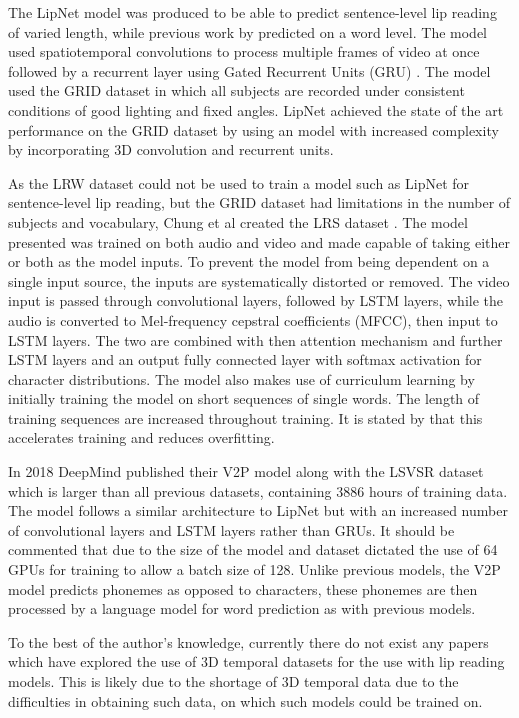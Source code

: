 \documentclass[12pt]{report}
\begin{document}
The LipNet model \cite{Assael2016} was produced to be able to predict sentence-level lip reading of varied length, while previous work by \cite{Chung2016} predicted on a word level.
The model used spatiotemporal convolutions to process multiple frames of video at once followed by a recurrent layer using Gated Recurrent Units (GRU) \cite{Cho2014}.
The model used the GRID dataset \cite{Cooke2006} in which all subjects are recorded under consistent conditions of good lighting and fixed angles.
LipNet achieved the state of the art performance on the GRID dataset by using an model with increased complexity by incorporating 3D convolution and recurrent units.

As the LRW dataset could not be used to train a model such as LipNet for sentence-level lip reading, but the GRID dataset had limitations in the number of subjects and vocabulary, Chung et al created the LRS dataset \cite{Chung2017}.
The model presented was trained on both audio and video and made capable of taking either or both as the model inputs.
To prevent the model from being dependent on a single input source, the inputs are systematically distorted or removed.
The video input is passed through convolutional layers, followed by LSTM layers, while the audio is converted to Mel-frequency cepstral coefficients (MFCC), then input to LSTM layers.
The two are combined with then attention mechanism and further LSTM layers and an output fully connected layer with softmax activation for character distributions.
The model also makes use of curriculum learning by initially training the model on short sequences of single words.
The length of training sequences are increased throughout training.
It is stated by \cite{Chung2017} that this accelerates training and reduces overfitting.

In 2018 DeepMind published their V2P model \cite{Shillingford2018} along with the LSVSR dataset which is larger than all previous datasets, containing 3886 hours of training data.
The model follows a similar architecture to LipNet \cite{Assael2016} but with an increased number of convolutional layers and LSTM layers rather than GRUs.
It should be commented that due to the size of the model and dataset dictated the use of 64 GPUs for training to allow a batch size of 128.
Unlike previous models, the V2P model predicts phonemes as opposed to characters, these phonemes are then processed by a language model for word prediction as with previous models.

To the best of the author's knowledge, currently there do not exist any papers which have explored the use of 3D temporal datasets for the use with lip reading models. 
This is likely due to the shortage of 3D temporal data due to the difficulties in obtaining such data, on which such models could be trained on.
\end{document}
